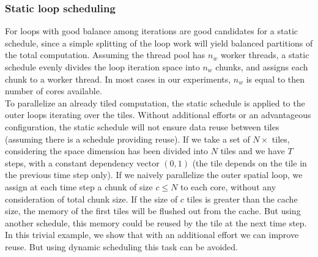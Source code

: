 \documentclass[a4paper,11pt]{article}
\begin{document}
\subsubsection{Static loop scheduling}
For loops with good balance among iterations are good candidates for a static schedule,
since a simple splitting of the loop work will yield balanced partitions of the total computation.
Assuming the thread pool has $n_{w}$ worker threads, a static schedule evenly divides 
the loop iteration space into $n_{w}$
chunks, and assigns each chunk to a worker thread.  In most cases in our experiments, $n_w$ is
equal to then number of cores available.\\
To parallelize an already tiled computation, the static schedule is applied to the outer loops
iterating over the tiles. Without additional efforts or an advantageous configuration, the
static schedule will not ensure data reuse between tiles (assuming there is a schedule providing
reuse). If we take a set of $N \times $ tiles, considering the space dimension has been
divided into $N$ tiles and we have $T$ steps, with a constant dependency vector $(0, 1)$ (the
tile depends on the tile in the previous time step only). If we naively parallelize the outer
spatial loop, we assign at each time step a chunk of size $c \leq N$ to each core, without any
consideration of total chunk size. If the size of $c$ tiles is greater than the cache size, the
memory of the first tiles will be flushed out from the cache. But using another schedule,
this memory could be reused by the tile at the next time step. In this trivial example, we
show that with an additional effort we can improve reuse. But using dynamic scheduling
this task can be avoided.
\end{document}
